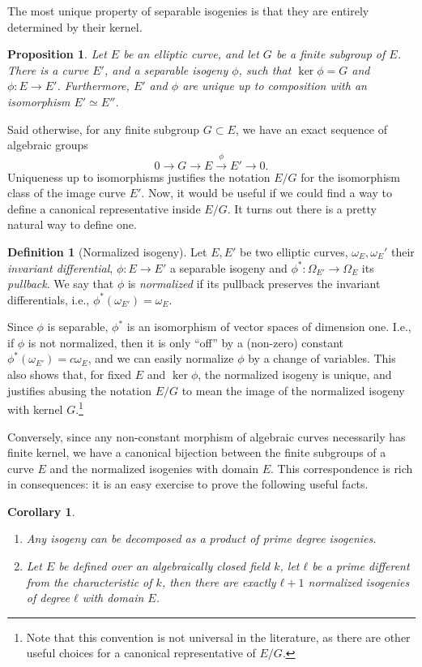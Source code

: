 \documentclass{report}
\theoremstyle{plain}
\newtheorem{corollary}[theorem]{Corollary}
\newtheorem{proposition}[theorem]{Proposition}
\theoremstyle{definition}
\newtheorem{definition}[theorem]{Definition}
\begin{document}
The most unique property of separable isogenies is that they are 
entirely determined by their kernel. %

\begin{proposition}
  Let $E$ be an elliptic curve, and let $G$ be a finite subgroup of
  $E$. %
  There is a curve $E'$, and a separable isogeny $ϕ$, such that
  $\ker ϕ=G$ and $ϕ:E→ E'$. %
  Furthermore, $E'$ and $ϕ$ are unique up to composition with an
  isomorphism $E'≃E''$. %
\end{proposition}

Said otherwise, for any finite subgroup $G⊂E$, we have an exact
sequence of algebraic groups
\begin{equation*}
  0 → G → E \overset{ϕ}{→} E' → 0.
\end{equation*}
Uniqueness up to isomorphisms justifies the notation $E/G$ for the
isomorphism class of the image curve $E'$. %
Now, it would be useful if we could find a way to define a canonical
representative inside $E/G$. %
It turns out there is a pretty natural way to define one.

\begin{definition}[Normalized isogeny]
  Let $E,E'$ be two elliptic curves, $ω_E,ω_E'$ their \emph{invariant
    differential}, $ϕ:E→ E'$ a separable isogeny and
  $ϕ^*:Ω_{E'}→ Ω_E$ its \emph{pullback}. %
  We say that $ϕ$ is \emph{normalized} if its pullback preserves the
  invariant differentials, i.e., $ϕ^*(ω_{E'})=ω_E$. %
\end{definition}

Since $ϕ$ is separable, $ϕ^*$ is an isomorphism of vector spaces of
dimension one. %
I.e., if $ϕ$ is not normalized, then it is only ``off'' by a
(non-zero) constant $ϕ^*(ω_{E'})=cω_E$, and we can easily normalize
$ϕ$ by a change of variables. %
This also shows that, for fixed $E$ and $\ker ϕ$, the normalized
isogeny is unique, and justifies abusing the notation $E/G$ to mean
the image of the normalized isogeny with kernel $G$.\footnote{Note
  that this convention is not universal in the literature, as there
  are other useful choices for a canonical representative of $E/G$.}

Conversely, since any non-constant morphism of algebraic curves
necessarily has finite kernel, we have a canonical bijection between
the finite subgroups of a curve $E$ and the normalized isogenies with
domain $E$. %
This correspondence is rich in consequences: it is an easy exercise to
prove the following useful facts. %

\begin{corollary}\ 
  \begin{enumerate}
  \item Any isogeny can be decomposed as a product of prime degree
    isogenies.
  \item Let $E$ be defined over an algebraically closed field $k$, let
    $ℓ$ be a prime different from the characteristic of $k$, then
    there are exactly $ℓ+1$ normalized isogenies of degree $ℓ$ with
    domain $E$.
  \end{enumerate}
\end{corollary}
\end{document}
